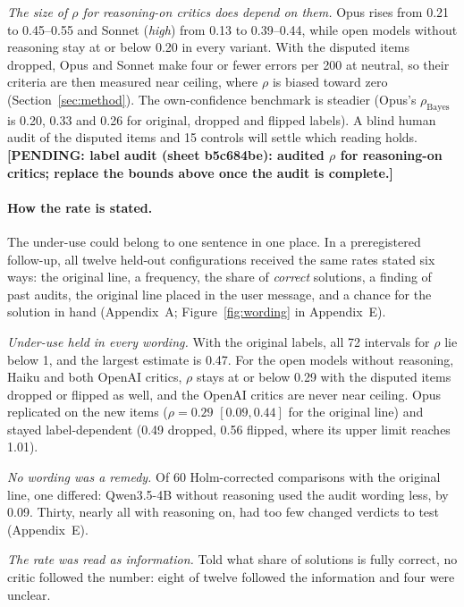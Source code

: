 \documentclass[letterpaper]{article} %
\newcommand{\pending}[1]{\textbf{[PENDING: #1]}}
\begin{document}
\emph{The size of $\rho$ for reasoning-on critics does depend on them.} Opus rises from 0.21 to 0.45--0.55 and Sonnet (\emph{high}) from 0.13 to 0.39--0.44, while open models without reasoning stay at or below 0.20 in every variant. With the disputed items dropped, Opus and Sonnet make four or fewer errors per 200 at neutral, so their criteria are then measured near ceiling, where $\rho$ is biased toward zero (Section~\ref{sec:method}). The own-confidence benchmark is steadier (Opus's $\rho_{\mathrm{Bayes}}$ is 0.20, 0.33 and 0.26 for original, dropped and flipped labels). A blind human audit of the disputed items and 15 controls will settle which reading holds. \pending{label audit (sheet b5c684be): audited $\rho$ for reasoning-on critics; replace the bounds above once the audit is complete.}

\paragraph{How the rate is stated.} The under-use could belong to one sentence in one place. In a preregistered follow-up, all twelve held-out configurations received the same rates stated six ways: the original line, a frequency, the share of \emph{correct} solutions, a finding of past audits, the original line placed in the user message, and a chance for the solution in hand (Appendix~A; Figure~\ref{fig:wording} in Appendix~E).

\emph{Under-use held in every wording.} With the original labels, all 72 intervals for $\rho$ lie below 1, and the largest estimate is 0.47. For the open models without reasoning, Haiku and both OpenAI critics, $\rho$ stays at or below 0.29 with the disputed items dropped or flipped as well, and the OpenAI critics are never near ceiling. Opus replicated on the new items ($\rho=0.29$ $[0.09, 0.44]$ for the original line) and stayed label-dependent (0.49 dropped, 0.56 flipped, where its upper limit reaches 1.01).

\emph{No wording was a remedy.} Of 60 Holm-corrected comparisons with the original line, one differed: Qwen3.5-4B without reasoning used the audit wording less, by 0.09. Thirty, nearly all with reasoning on, had too few changed verdicts to test (Appendix~E).

\emph{The rate was read as information.} Told what share of solutions is fully correct, no critic followed the number: eight of twelve followed the information and four were unclear.

\end{document}
